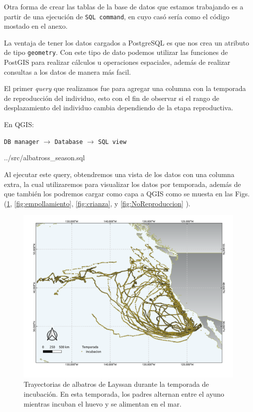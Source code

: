 Otra forma de crear las tablas de la base de datos que estamos trabajando es a
partir de una ejecución de \texttt{SQL command}, en cuyo casó sería como el
código mostado en el anexo.

La ventaja de tener los datos cargados a PostgreSQL es que nos crea un atributo
de tipo \texttt{geometry}. Con este tipo de dato podemos utilizar las funciones
de PostGIS para realizar cálculos u operaciones espaciales, además de realizar
consultas a los datos de manera más facil.

El primer \textit{query} que realizamos fue para agregar una columna con la
temporada de reproducción del individuo, esto con el fin de observar si el rango
de desplazamiento del individuo cambia dependiendo de la etapa reproductiva.

En QGIS:

\texttt{DB manager} $\rightarrow$ \texttt{Database} $\rightarrow$ \texttt{SQL
view} 

 {../src/albatross_season.sql}

Al ejecutar este query, obtendremos una vista de los datos con una columna
extra, la cual utilizaremos para visualizar los datos por temporada, además de
que también los podremos cargar como capa a QGIS como se muesta en las Figs.
(\ref{fig:incubacion}, \ref{fig:empollamiento}, \ref{fig:crianza}, y
\ref{fig:NoReproduccion}
).

\begin{figure}[h]
    \centering
    \includegraphics[scale=0.6]{figures/seasonsIncubacion.png}
    \caption{Trayectorias de albatros de Layssan durante la temporada de
    incubación. En esta temporada, los padres alternan entre el ayuno mientras
    incuban el huevo y se alimentan en el mar.}
    \label{fig:incubacion}
\end{figure}


